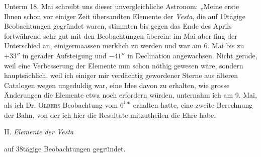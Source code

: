 \par\indent Unterm 18. Mai schreibt uns dieser unvergleichliche Astronom: „Meine erste Ihnen schon vor einiger Zeit übersandten Elemente der \emph{Vesta}, die auf 19tägige Beobachtungen gegründet waren, stimmten bis gegen das Ende des Aprils fortwährend sehr gut mit den Beobachtungen überein: im Mai aber fing der Unterschied an, einigermaassen merklich zu werden und war am 6. Mai bis zu $+33''$ in gerader Aufsteigung und $-41''$ in Declination angewachsen. Nicht gerade, weil eine Verbesserung der Elemente nun schon nöthig gewesen wäre, sondern hauptsächlich, weil ich einiger mir verdächtig gewordener Sterne aus älteren Catalogen wegen ungeduldig war, eine Idee davon zu erhalten, wie grosse Änderungen die Elemente etwa noch erfordern würden, unternahm ich am 9. Mai, als ich Dr. \textsc{Olbers} Beobachtung vom $6^{\text{ten}}$ erhalten hatte, eine zweite Berechnung der Bahn, von der ich hier die Resultate mitzutheilen die Ehre habe.

\begin{center}
II. \emph{Elemente der Vesta}
\end{center}

\begin{center}
auf 38tägige Beobachtungen gegründet.
\end{center}

\begin{center}\begingroup\fontsize{9}{11}\selectfont\setlength{\tabcolsep}{3pt}\renewcommand{\arraystretch}{1.13}
%
\ifdim\wd0>\linewidth\resizebox{\linewidth}{!}{\usebox{0}}\else\usebox{0}\fi
\endgroup\end{center}

